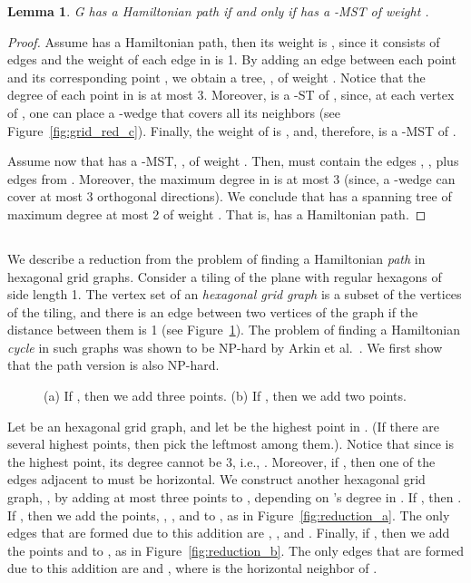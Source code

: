 \documentclass[11pt]{article}
\newtheorem{lemma}[theorem]{Lemma}
\begin{document}
\begin{lemma}
\label{lem:hardness1}
G has a Hamiltonian path if and only if  has a -MST of weight . 
\end{lemma}
\begin{proof}
Assume  has a Hamiltonian path, then its weight is , since it consists of  edges and the weight of each edge in  is 1.
By adding an edge between each point  and its corresponding point , we obtain a tree, , of weight . Notice that the degree of each point in  is at most 3. Moreover,  is a -ST of , since, at each vertex of , one can place a -wedge that covers all its neighbors (see Figure~\ref{fig:grid_red_c}). Finally, the weight of  is , and, therefore,  is a -MST of .

Assume now that  has a -MST, , of weight . Then,  must contain the  edges , , plus  edges from . Moreover, the maximum degree in  is at most 3 (since, a -wedge can cover at most 3 orthogonal directions). We conclude that  has a spanning tree of maximum degree at most 2 of weight . That is,  has a Hamiltonian path.
\end{proof}


\subsection{}

We describe a reduction from the problem of finding a Hamiltonian {\em path} in hexagonal grid graphs. 
Consider a tiling of the plane with regular hexagons of side length 1. The vertex set of an {\em hexagonal grid graph} is a subset of the vertices of the tiling, and there is an edge between two vertices of the graph if the distance between them is 1 (see Figure~\ref{fig:reduction120}). 
The problem of finding a Hamiltonian {\em cycle} in such graphs was shown to be NP-hard by Arkin et al.~\cite{AFIMMRPRX09}.
We first show that the path version is also NP-hard.

\begin{figure}[htb]
\centering
	\hspace{.75cm}
 	\caption{(a) If , then we add three points. (b) If , then we add two points.} \label{fig:reduction120}	
\end{figure} 
 
Let  be an hexagonal grid graph, and let  be the highest point in . (If there are several highest points, then pick the leftmost among them.). Notice that since  is the highest point, its degree cannot be 3, i.e., . 
Moreover, if , then one of the edges adjacent to  must be horizontal.
We construct another hexagonal grid graph, , by adding at most three points to , depending on 's degree in .
If , then .
If , then we add the points, , , and  to , as in Figure~\ref{fig:reduction_a}. The only edges that are formed due to this addition are , , and .
Finally, if , then  we add the points  and  to , as in Figure~\ref{fig:reduction_b}. The only edges that are formed due to this addition are  and , where  is the horizontal neighbor of .
\end{document}
